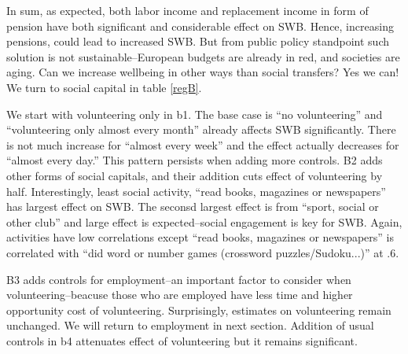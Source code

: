 \documentclass[10pt, letterpaper]{article}
\begin{document}
\begin{spacing}{1.4}
In sum, as expected, both labor income and replacement income in form of pension
have both significant and considerable effect on SWB. Hence, increasing
pensions, could lead to increased SWB. But from public policy standpoint such
solution is not sustainable--European budgets are already in red,  and societies are
aging. Can we increase wellbeing in other ways than social transfers? Yes we
can! We turn to social capital in table \ref{regB}.

We start with  volunteering only in b1. The base case is ``no volunteering'' and
 ``volunteering only almost every month'' already affects SWB significantly. There is not
much increase for ``almost every week'' and the effect actually decreases for ``almost
every day.'' This pattern persists when adding more controls. B2 adds other forms
of social capitals, and their addition cuts effect of volunteering by half.
%
 Interestingly, least social activity,  ``read books, magazines or newspapers'' has 
largest effect on SWB. The seconsd largest effect is from ``sport, social or other
club'' and large effect is
expected--social engagement is key for SWB. Again, activities have low
correlations except ``read books, magazines or newspapers'' is
correlated with ``did word or number games (crossword puzzles/Sudoku...)'' at
.6.



B3 adds  controls for employment--an important factor to consider when
volunteering--beacuse those who are employed have less time and higher
opportunity cost of volunteering. Surprisingly, estimates on volunteering remain
unchanged. We will return to employment in next section.
Addition of usual controls in b4 attenuates effect of volunteering but it
remains significant.
 





\end{spacing}
\end{document}
